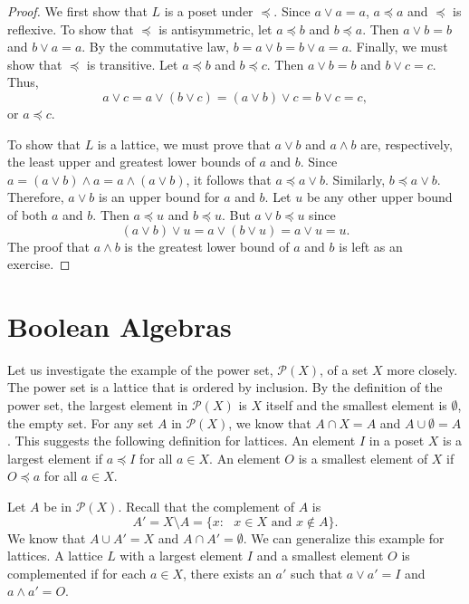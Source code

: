  
\begin{proof}
We first show that $L$ is a poset under $\preceq$. Since $a \vee a =
a$, $a \preceq a$ and $\preceq$ is reflexive. To show that $\preceq$
is antisymmetric, let $a \preceq b$ and $b \preceq a$. Then $a \vee b
= b$ and $b \vee a = a$.  By the commutative law, $b = a \vee b
= b \vee a = a$.   Finally, we must show that $\preceq$ is
transitive. Let $a \preceq b$ and $b \preceq c$. Then $a \vee b = b$
and $b \vee c = c$.  Thus,
\[
a \vee c = a \vee (b \vee c ) = ( a \vee b) \vee c = b \vee c = c,
\]
or $a \preceq c$.
 
To show that $L$ is a lattice, we must prove that $a \vee b$ and $a
\wedge b$ are, respectively, the least upper and greatest lower bounds
of $a$ and $b$. Since $a=(a \vee b) \wedge a = a \wedge (a \vee b)$,
it follows that $a \preceq a \vee b$.  Similarly, $b \preceq a \vee
b$. Therefore, $a \vee b$ is an upper bound for $a$ and $b$. Let $u$
be any other upper bound of both $a$ and $b$. Then $a \preceq u$ and
$b \preceq u$. But $a \vee b \preceq u$ since 
\[
(a \vee b) \vee u = a \vee (b \vee u) = a \vee u = u.
\]
The proof that $a \wedge b$ is the greatest lower bound of $a$ and
$b$ is left as an exercise.
\end{proof}
 
 
 
\section{Boolean Algebras}
 
 
Let us investigate the example of the power set, ${\mathcal P}(X)$, of a
set $X$ more  closely. The power set is a lattice that is  ordered by
inclusion. By the definition of the power set, the largest element in
${\mathcal P}(X)$ is $X$ itself and the smallest element is $\emptyset$,
the empty set. For any set $A$ in ${\mathcal P}(X)$, we know that $A \cap
X = A$ and $A \cup \emptyset = A$. This suggests the following
definition for lattices. An element $I$\label{notelargeposet} 
in a poset $X$ is a {\bfi
largest element\/} if $a \preceq I$ for
all $a \in X$.  An element $O$\label{notesmallposet} 
 is a  {\bfi smallest
element\/} of $X$ if $O \preceq a$ for
all $a \in X$.  
 
 
Let $A$ be in ${\mathcal P}(X)$. Recall that the complement of $A$ is
\[
A' = X \setminus A = \{ x : \mbox{ $x \in X$ and $x \notin A$}  \}.
\]
We know that $A \cup A' = X$ and $A \cap A' = \emptyset$. We can
generalize this example for lattices. A lattice $L$ with a largest
element $I$ and a smallest element $O$ is {\bfi
complemented\/} if for each $a \in X$, there
exists an $a'$\label{notedlatticecomp} 
such that $a \vee a' = I$ and $a \wedge a' = O$.
 
